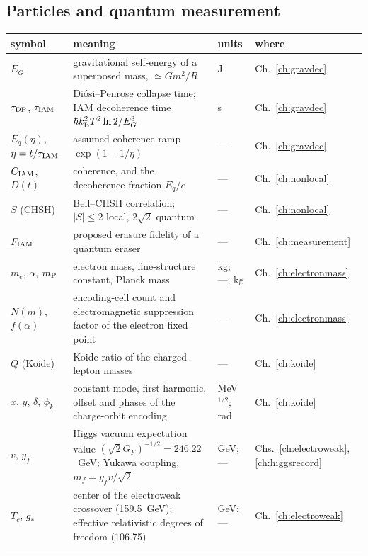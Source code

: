 \subsection*{Particles and quantum measurement}
{\small\begin{longtable}{@{}>{\raggedright\arraybackslash}p{}>{\raggedright\arraybackslash}p{}>{\raggedright\arraybackslash}p{}>{\raggedright\arraybackslash}p{}@{}}
\toprule symbol & meaning & units & where\\\midrule\endhead
$E_G$ & gravitational self-energy of a superposed mass, $\simeq Gm^2/R$ & J & Ch.~\ref{ch:gravdec}\\\iamrowrule
$\tau_{\rm DP}$, $\tau_{\rm IAM}$ & Di\'osi--Penrose collapse time; IAM decoherence time $\hbar k_{\mathrm B}^2T^2\ln2/E_G^3$ & s & Ch.~\ref{ch:gravdec}\\\iamrowrule
$E_q(\eta)$, $\eta=t/\tau_{\rm IAM}$ & assumed coherence ramp $\exp(1-1/\eta)$ & --- & Ch.~\ref{ch:gravdec}\\\iamrowrule
$C_{\rm IAM}$, $D(t)$ & coherence, and the decoherence fraction $E_q/e$ & --- & Ch.~\ref{ch:nonlocal}\\\iamrowrule
$S$ (CHSH) & Bell--CHSH correlation; $|S|\le2$ local, $2\sqrt2$ quantum & --- & Ch.~\ref{ch:nonlocal}\\\iamrowrule
$F_{\rm IAM}$ & proposed erasure fidelity of a quantum eraser & --- & Ch.~\ref{ch:measurement}\\\iamrowrule
$m_e$, $\alpha$, $m_{\mathrm P}$ & electron mass, fine-structure constant, Planck mass & kg; ---; kg & Ch.~\ref{ch:electronmass}\\\iamrowrule
$N(m)$, $f(\alpha)$ & encoding-cell count and electromagnetic suppression factor of the electron fixed point & --- & Ch.~\ref{ch:electronmass}\\\iamrowrule
$Q$ (Koide) & Koide ratio of the charged-lepton masses & --- & Ch.~\ref{ch:koide}\\\iamrowrule
$x$, $y$, $\delta$, $\phi_k$ & constant mode, first harmonic, offset and phases of the charge-orbit encoding & MeV$^{1/2}$; rad & Ch.~\ref{ch:koide}\\\iamrowrule
$v$, $y_f$ & Higgs vacuum expectation value $(\sqrt2G_F)^{-1/2}=246.22$~GeV; Yukawa coupling, $m_f=y_fv/\sqrt2$ & GeV; --- & Chs.~\ref{ch:electroweak}, \ref{ch:higgsrecord}\\\iamrowrule
$T_c$, $g_*$ & center of the electroweak crossover (159.5~GeV); effective relativistic degrees of freedom (106.75) & GeV; --- & Ch.~\ref{ch:electroweak}\\\iamrowrule

\end{longtable}}
